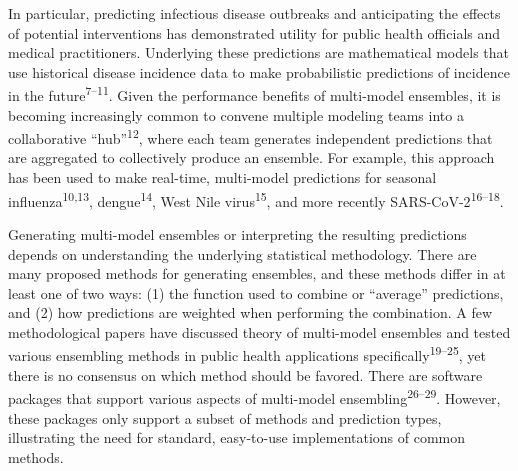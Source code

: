\documentclass[
  letterpaper,
  DIV=11,
  numbers=noendperiod]{scrartcl}
\begin{document}
In particular, predicting infectious disease outbreaks and anticipating
the effects of potential interventions has demonstrated utility for
public health officials and medical practitioners. Underlying these
predictions are mathematical models that use historical disease
incidence data to make probabilistic predictions of incidence in the
future\textsuperscript{7--11}. Given the performance benefits of
multi-model ensembles, it is becoming increasingly common to convene
multiple modeling teams into a collaborative
``hub''\textsuperscript{12}, where each team generates independent
predictions that are aggregated to collectively produce an ensemble. For
example, this approach has been used to make real-time, multi-model
predictions for seasonal influenza\textsuperscript{10,13},
dengue\textsuperscript{14}, West Nile virus\textsuperscript{15}, and
more recently SARS-CoV-2\textsuperscript{16--18}.

Generating multi-model ensembles or interpreting the resulting
predictions depends on understanding the underlying statistical
methodology. There are many proposed methods for generating ensembles,
and these methods differ in at least one of two ways: (1) the function
used to combine or ``average'' predictions, and (2) how predictions are
weighted when performing the combination. A few methodological papers
have discussed theory of multi-model ensembles and tested various
ensembling methods in public health applications
specifically\textsuperscript{19--25}, yet there is no consensus on which
method should be favored. There are software packages that support
various aspects of multi-model ensembling\textsuperscript{26--29}.
However, these packages only support a subset of methods and prediction
types, illustrating the need for standard, easy-to-use implementations
of common methods.
\end{document}
